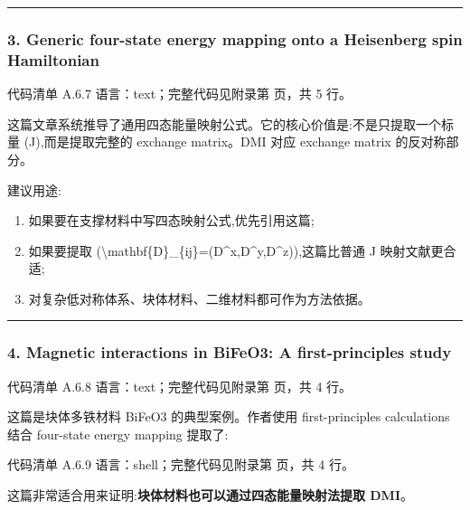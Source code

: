 \documentclass[lang=cn,scheme=chinese,color=blue,device=normal,toc=onecol,math=cm]{elegantbook}
\begin{document}
\medskip\hrule\medskip


\subsubsection{3. Generic four-state energy mapping onto a Heisenberg spin Hamiltonian}


\begin{codeindexbox}{代码清单 A.6.7}
语言：text；完整代码见附录第 \pageref{code:6:7} 页，共 5 行。
\end{codeindexbox}


这篇文章系统推导了通用四态能量映射公式。它的核心价值是:不是只提取一个标量 (J),而是提取完整的 exchange matrix。DMI 对应 exchange matrix 的反对称部分。\par


建议用途:\par


\begin{enumerate}
\item 如果要在支撑材料中写四态映射公式,优先引用这篇;
\item 如果要提取 (\textbackslash{}\allowbreak{}mathbf\{D\}\_\allowbreak{}\{ij\}=(D\textasciicircum{}x,D\textasciicircum{}y,D\textasciicircum{}z)),这篇比普通 J 映射文献更合适;
\item 对复杂低对称体系、块体材料、二维材料都可作为方法依据。
\end{enumerate}


\medskip\hrule\medskip


\subsubsection{4. Magnetic interactions in BiFeO3: A first-principles study}


\begin{codeindexbox}{代码清单 A.6.8}
语言：text；完整代码见附录第 \pageref{code:6:8} 页，共 4 行。
\end{codeindexbox}


这篇是块体多铁材料 BiFeO3 的典型案例。作者使用 first-principles calculations 结合 four-state energy mapping 提取了:\par


\begin{codeindexbox}{代码清单 A.6.9}
语言：shell；完整代码见附录第 \pageref{code:6:9} 页，共 4 行。
\end{codeindexbox}


这篇非常适合用来证明:\textbf{块体材料也可以通过四态能量映射法提取 DMI}。\par
\end{document}
